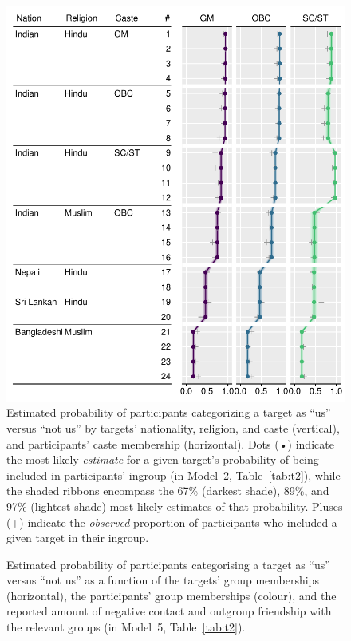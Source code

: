 \documentclass[12pt,a4paper]{article}
\begin{document}
\begin{figure}
\centering
\includegraphics[scale=1]{../figures/figure-2}
\caption{
Estimated probability of participants categorizing a target as ``us'' versus ``not us'' by targets' nationality, religion, and caste (vertical), and participants' caste membership (horizontal). Dots (•) indicate the most likely \emph{estimate} for a given target's probability of being included in participants' ingroup (in Model~2, Table~\ref{tab:t2}), while the shaded ribbons encompass the 67\% (darkest shade), 89\%, and 97\% (lightest shade) most likely estimates of that probability. Pluses (+) indicate the \emph{observed} proportion of participants who included a given target in their ingroup. %
}
\label{fig:f2}
\end{figure}

\begin{figure}
\centering
\caption{Estimated probability of participants categorising a target as ``us'' versus ``not us'' as a function of the targets' group memberships (horizontal), the participants' group memberships (colour), and the reported amount of negative contact and outgroup friendship with the relevant groups         (in Model~5, Table~\ref{tab:t2}).}
\label{fig:f3}
\end{figure}
\end{document}

